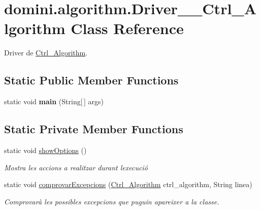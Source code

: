 \hypertarget{classdomini_1_1algorithm_1_1Driver____Ctrl__Algorithm}{}\section{domini.\+algorithm.\+Driver\+\_\+\+\_\+\+Ctrl\+\_\+\+Algorithm Class Reference}
\label{classdomini_1_1algorithm_1_1Driver____Ctrl__Algorithm}


Driver de \hyperlink{classdomini_1_1algorithm_1_1Ctrl__Algorithm}{Ctrl\+\_\+\+Algorithm}.  


\subsection*{Static Public Member Functions}
\begin{DoxyCompactItemize}
\item 
\mbox{\label{classdomini_1_1algorithm_1_1Driver____Ctrl__Algorithm_a2aa6a8b8f8c0c991a11b30e2bd1f244e}} 
static void {\bfseries main} (String\mbox{[}$\,$\mbox{]} args)
\end{DoxyCompactItemize}
\subsection*{Static Private Member Functions}
\begin{DoxyCompactItemize}
\item 
\mbox{\label{classdomini_1_1algorithm_1_1Driver____Ctrl__Algorithm_afad303731ad32c08c8dbffbf63b3fd9f}} 
static void \hyperlink{classdomini_1_1algorithm_1_1Driver____Ctrl__Algorithm_afad303731ad32c08c8dbffbf63b3fd9f}{show\+Options} ()
\begin{DoxyCompactList}\small\item\em Mostra les accions a realitzar durant l\textquotesingle{}execució \end{DoxyCompactList}\item 
static void \hyperlink{classdomini_1_1algorithm_1_1Driver____Ctrl__Algorithm_a38ad7761ecde80325d83ce2d2597a61b}{comprovar\+Excepcions} (\hyperlink{classdomini_1_1algorithm_1_1Ctrl__Algorithm}{Ctrl\+\_\+\+Algorithm} ctrl\+\_\+algorithm, String linea)
\begin{DoxyCompactList}\small\item\em Comprovarà les possibles excepcions que puguin apareixer a la classe. \end{DoxyCompactList}\end{DoxyCompactItemize}


